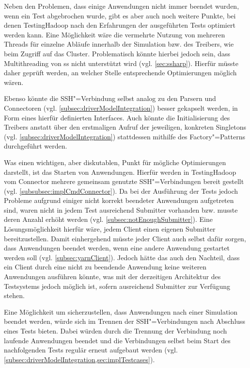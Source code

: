 Neben den Problemen, dass einige Anwendungen nicht immer beendet wurden, wenn ein Test abgebrochen wurde, gibt es aber auch noch weitere Punkte, bei denen TestingHadoop nach den Erfahrungen der ausgeführten Tests optimiert werden kann.
Eine Möglichkeit wäre \zB die vermehrte Nutzung von mehreren Threads für einzelne Abläufe innerhalb der Simulation bzw. des Treibers, wie beim Zugriff auf das Cluster.
Problematisch könnte hierbei jedoch sein, dass Multithreading von \gls{ss} nicht unterstützt wird (vgl. \cref{sec:ssharp}).
Hierfür müsste daher geprüft werden, an welcher Stelle entsprechende Optimierungen möglich wären.

Ebenso könnte die SSH"=Verbindung selbst analog zu den Parsern und Connectoren (vgl. \cref{subsec:driverModelIntegration}) besser gekapselt werden, \zB in Form eines hierfür definierten Interfaces.
Auch könnte die Initialisierung des Treibers anstatt über den erstmaligen Aufruf der jeweiligen, konkreten Singletons (vgl. \cref{subsec:driverModelIntegration}) stattdessen mithilfe des Factory"=Patterns durchgeführt werden.

Was einen wichtigen, aber diskutablen, Punkt für mögliche Optimierungen darstellt, ist das Starten von Anwendungen.
Hierfür werden in TestingHadoop vom Connector mehrere gemeinsam genutzte SSH"=Verbindungen bereit gestellt (vgl. \cref{subsubsec:implCmdConnector}).
Da bei der Ausführung der Tests jedoch Probleme aufgrund einiger nicht korrekt beendeter Anwendungen aufgetreten sind, waren nicht in jedem Test ausreichend Submitter vorhanden bzw. musste deren Anzahl erhöht werden (vgl. \cref{subsec:notEnoughSubmitter}).
Eine Lösungsmöglichkeit hierfür wäre, jedem Client einen eigenen Submitter bereitzustellen.
Damit einhergehend müsste jeder Client auch selbst dafür sorgen, dass Anwendungen beendet werden, wenn eine andere Anwendung gestartet werden soll (vgl. \cref{subsec:yarnClient}).
Jedoch hätte das auch den Nachteil, dass ein Client durch eine nicht zu beendende Anwendung keine weiteren Anwendungen ausführen könnte, was mit der derzeitigen Architektur des Testsystems jedoch möglich ist, sofern ausreichend Submitter zur Verfügung stehen.

Eine Möglichkeit um sicherzustellen, dass Anwendungen nach einer Simulation beendet werden, würde sich im Trennen der SSH"=Verbindungen nach Abschluss eines Tests bieten.
Dabei würden durch die Trennung der Verbindung noch laufende Anwendungen beendet und die Verbindungen selbst beim Start des nachfolgenden Tests regulär erneut aufgebaut werden (vgl. \cref{subsec:driverModelIntegration,sec:implTestcases}).

